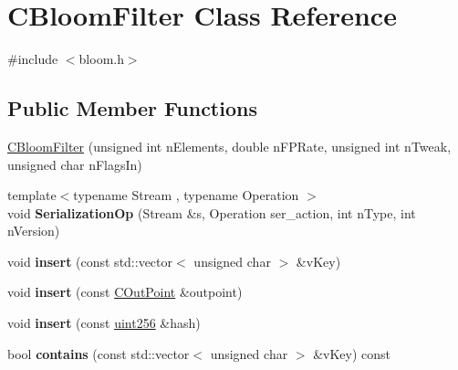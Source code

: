 \hypertarget{class_c_bloom_filter}{}\section{C\+Bloom\+Filter Class Reference}
\label{class_c_bloom_filter}


{\ttfamily \#include $<$bloom.\+h$>$}

\subsection*{Public Member Functions}
\begin{DoxyCompactItemize}
\item 
\mbox{\hyperlink{class_c_bloom_filter_a6395cfcb278ed9cf4ae873549c996f83}{C\+Bloom\+Filter}} (unsigned int n\+Elements, double n\+F\+P\+Rate, unsigned int n\+Tweak, unsigned char n\+Flags\+In)
\item 
\mbox{\label{class_c_bloom_filter_a2d12234d7febc6197a7349d609733cca}} 
{\footnotesize template$<$typename Stream , typename Operation $>$ }\\void {\bfseries Serialization\+Op} (Stream \&s, Operation ser\+\_\+action, int n\+Type, int n\+Version)
\item 
\mbox{\label{class_c_bloom_filter_abba52843c7c691ef7deb07d9a645dcc2}} 
void {\bfseries insert} (const std\+::vector$<$ unsigned char $>$ \&v\+Key)
\item 
\mbox{\label{class_c_bloom_filter_aa77e023fc94fd17a0532bf17906e2146}} 
void {\bfseries insert} (const \mbox{\hyperlink{class_c_out_point}{C\+Out\+Point}} \&outpoint)
\item 
\mbox{\label{class_c_bloom_filter_ac86479ac4ac157a7f0188baaa93202cb}} 
void {\bfseries insert} (const \mbox{\hyperlink{classuint256}{uint256}} \&hash)
\item 
\mbox{\label{class_c_bloom_filter_afe62e10a4c4cf64e18a2a659d0bcc31b}} 
bool {\bfseries contains} (const std\+::vector$<$ unsigned char $>$ \&v\+Key) const
\item 
\mbox{\label{class_c_bloom_filter_af4557c3253f218eaf13e6d7da53e20e9}} 

\end{DoxyCompactItemize}
